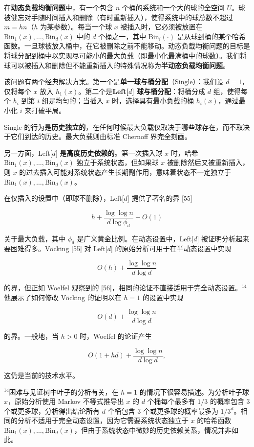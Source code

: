 \documentclass[12pt,a4paper]{ctexart}
\theoremstyle{remark}
\begin{document}
在\textbf{动态负载均衡问题}中，有一个包含 $n$ 个桶的系统和一个大的球的全空间 $U$。球被健忘对手随时间插入和删除（有时重新插入），使得系统中的球总数不超过 $m=hn$（$h$ 为某参数）。每当一个球 $x$ 被插入时，它必须被放置在 $\text{Bin}_1(x),\ldots,\text{Bin}_d(x)$ 中的 $d$ 个桶之一，其中 $\text{Bin}_i(\cdot)$ 是从球到桶的某个哈希函数。一旦球被放入桶中，在它被删除之前不能移动。动态负载均衡问题的目标是将球分配到桶中以实现尽可能小的最大负载（即最小化最满桶中的球数）。我们将球可以被插入和删除但不能重新插入的特殊情况称为\textbf{半动态负载均衡问题}。

该问题有两个经典解决方案。第一个是\textbf{单一球与桶分配}（Single）：我们设 $d=1$，仅将每个 $x$ 放入 $h_1(x)$。第二个是\textbf{Left[$d$] 球与桶分配}：将桶分成 $d$ 组，使得每个 $h_i$ 到第 $i$ 组是均匀的；当插入 $x$ 时，选择具有最小负载的桶 $h_i(x)$，通过最小化 $i$ 来打破平局。

Single 的行为是\textbf{历史独立的}，在任何时候最大负载仅取决于哪些球存在，而不取决于它们到达的历史。最大负载则由标准 Chernoff 界完全刻画。

另一方面，Left[$d$] 是\textbf{高度历史依赖的}。第一次插入球 $x$ 时，哈希 $\text{Bin}_1(x),\ldots,\text{Bin}_d(x)$ 独立于系统状态，但如果球 $x$ 被删除然后又被重新插入，则 $x$ 的过去插入可能对系统状态产生长期副作用，意味着状态不一定独立于 $\text{Bin}_1(x),\ldots,\text{Bin}_d(x)$。

在仅插入的设置中（即球不删除），Left[$d$] 提供了著名的界 [55]

$$h+\frac{\log\log n}{d\log\phi_d}+O(1)\tag{5}$$

关于最大负载，其中 $\phi_d$ 是广义黄金比例。在动态设置中，Left[$d$] 被证明分析起来要困难得多。Vöcking [55] 对 Left[$d$] 的原始分析可用于在半动态设置中实现

$$O(h)+\frac{\log\log n}{d\log d}\tag{6}$$

的界，但正如 Woelfel 观察到的 [56]，相同的论证不直接适用于完全动态设置。$^{14}$ 他展示了如何修改 Vöcking 的证明以在 $h=1$ 的设置中实现

$$O(d)+\frac{\log\log n}{d\log d}\tag{7}$$

的界。一般地，当 $h>0$ 时，Woelfel 的论证产生

$$O(1+hd)+\frac{\log\log n}{d\log d},\tag{8}$$

这仍是当前的技术水平。

$^{14}$困难与见证树中叶子的分析有关，在 $h=1$ 的情况下很容易描述。为分析叶子球 $x$，原始分析使用 Markov 不等式推导出 $x$ 的 $d$ 个桶每个最多有 $1/3$ 的概率包含 3 个或更多球，分析得出结论所有 $d$ 个桶包含 3 个或更多球的概率最多为 $1/3^d$。相同的分析不适用于完全动态设置，因为它需要系统状态独立于 $x$ 的哈希函数 $\text{Bin}_1(x),\ldots,\text{Bin}_d(x)$，但由于系统状态中微妙的历史依赖关系，情况并非如此。
\end{document}

